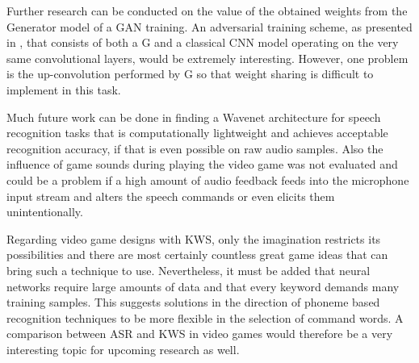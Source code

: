 Further research can be conducted on the value of the obtained weights from the Generator model of a GAN training. 
An adversarial training scheme, as presented in \cite{Oezdenizci2020}, that consists of both a G and a classical CNN model operating on the very same convolutional layers, would be extremely interesting. 
However, one problem is the up-convolution performed by G so that weight sharing is difficult to implement in this task.

Much future work can be done in finding a Wavenet architecture for speech recognition tasks that is computationally lightweight and achieves acceptable recognition accuracy, if that is even possible on raw audio samples.
Also the influence of game sounds during playing the video game was not evaluated and could be a problem if a high amount of audio feedback feeds into the microphone input stream and alters the speech commands or even elicits them unintentionally.

Regarding video game designs with KWS, only the imagination restricts its possibilities and there are most certainly countless great game ideas that can bring such a technique to use.
Nevertheless, it must be added that neural networks require large amounts of data and that every keyword demands many training samples.
This suggests solutions in the direction of phoneme based recognition techniques to be more flexible in the selection of command words.
A comparison between ASR and KWS in video games would therefore be a very interesting topic for upcoming research as well.